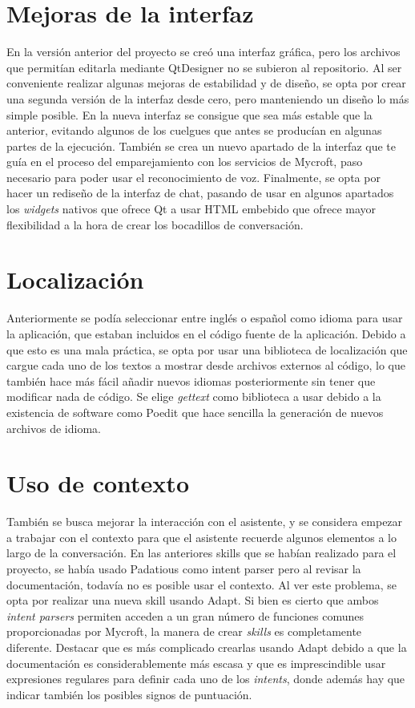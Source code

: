 \section{Mejoras de la interfaz}
En la versión anterior del proyecto se creó una interfaz gráfica, pero los archivos que permitían editarla mediante QtDesigner no se subieron al repositorio. Al ser conveniente realizar algunas mejoras de estabilidad y de diseño, se opta por crear una segunda versión de la interfaz desde cero, pero manteniendo un diseño lo más simple posible. En la nueva interfaz se consigue que sea más estable que la anterior, evitando algunos de los cuelgues que antes se producían en algunas partes de la ejecución. También se crea un nuevo apartado de la interfaz que te guía en el proceso del emparejamiento con los servicios de Mycroft, paso necesario para poder usar el reconocimiento de voz. Finalmente, se opta por hacer un rediseño de la interfaz de chat, pasando de usar en algunos apartados los \textit{widgets} nativos que ofrece Qt a usar HTML embebido que ofrece mayor flexibilidad a la hora de crear los bocadillos de conversación.

\section{Localización}
Anteriormente se podía seleccionar entre inglés o español como idioma para usar la aplicación, que estaban incluidos en el código fuente de la aplicación. Debido a que esto es una mala práctica, se opta por usar una biblioteca de localización que cargue cada uno de los textos a mostrar desde archivos externos al código, lo que también hace más fácil añadir nuevos idiomas posteriormente sin tener que modificar nada de código. Se elige \textit{gettext} como biblioteca a usar debido a la existencia de software como Poedit que hace sencilla la generación de nuevos archivos de idioma.

\section{Uso de contexto}
También se busca mejorar la interacción con el asistente, y se considera empezar a trabajar con el contexto para que el asistente recuerde algunos elementos a lo largo de la conversación. En las anteriores skills que se habían realizado para el proyecto, se había usado Padatious como intent parser pero al revisar la documentación, todavía no es posible usar el contexto. Al ver este problema, se opta por realizar una nueva skill usando Adapt.
Si bien es cierto que ambos \textit{intent parsers} permiten acceden a un gran número de funciones comunes proporcionadas por Mycroft, la manera de crear \textit{skills} es completamente diferente. Destacar que es más complicado crearlas usando Adapt debido a que la documentación es considerablemente más escasa y que es imprescindible usar expresiones regulares para definir cada uno de los \textit{intents}, donde además hay que indicar también los posibles signos de puntuación.


